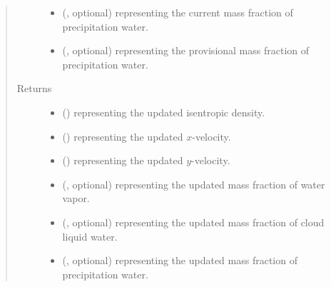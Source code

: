 \documentclass[letterpaper,10pt,english]{sphinxmanual}
\begin{document}
\begin{fulllineitems}
\begin{fulllineitems}
\begin{quote}
\begin{description}
\begin{itemize}
\item {} 
 (, optional) \textendash{}  representing the current mass fraction of precipitation water.

\item {} 
 (, optional) \textendash{}  representing the provisional mass fraction of precipitation water.

\end{itemize}

\item[{Returns}] \leavevmode
\begin{itemize}
\item {} 
 () \textendash{}  representing the updated isentropic density.

\item {} 
 () \textendash{}  representing the updated \(x\)-velocity.

\item {} 
 () \textendash{}  representing the updated \(y\)-velocity.

\item {} 
 (, optional) \textendash{}  representing the updated mass fraction of water vapor.

\item {} 
 (, optional) \textendash{}  representing the updated mass fraction of cloud liquid water.

\item {} 
 (, optional) \textendash{}  representing the updated mass fraction of precipitation water.

\end{itemize}


\end{description}\end{quote}

\end{fulllineitems}



\end{fulllineitems}
\end{document}
